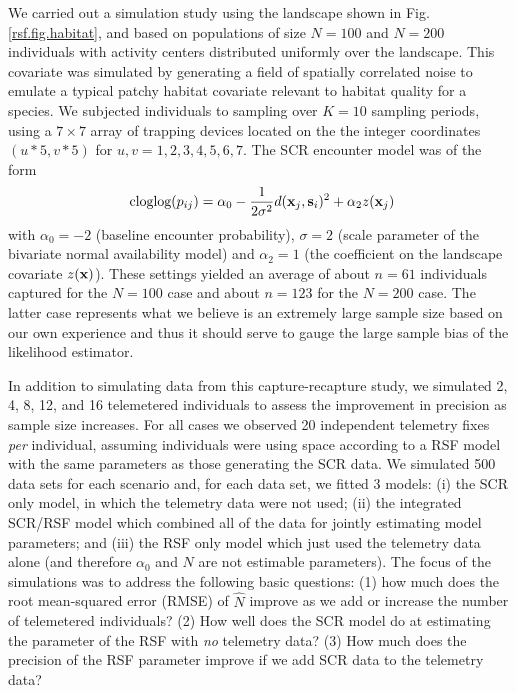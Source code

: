 \documentclass[12pt]{article}
\begin{document}
We carried out a simulation study using the landscape shown in
Fig. \ref{rsf.fig.habitat}, and based on populations of size $N=100$ and $N=200$
individuals with activity centers distributed uniformly over the
landscape.  This covariate was simulated by generating a field
of spatially correlated noise to emulate a typical patchy habitat
covariate relevant to habitat quality for a species.  We subjected individuals
to sampling over $K=10$ sampling periods, using a $7 \times 7$ array
of trapping devices located on the the integer coordinates $(u*5,v*5)$
for $u,v = 1,2,3,4,5,6,7$. The SCR encounter model was of the form
\[
\mbox{ cloglog}(p_{ij}) = \alpha_{0}  -\frac{1}{2\sigma^{2}}
d({\bf x}_{j},{\bf s}_{i})^{2} + \alpha_{2}  z({\bf x}_{j})
\]
with $\alpha_{0} = -2$ (baseline encounter probability), $\sigma =2$
(scale parameter of the bivariate normal availability model) and
$\alpha_{2} = 1$ (the coefficient on the landscape covariate $z({\bf
  x})$). 
These
settings yielded an average of about $n=61$ individuals captured for
the $N=100$ case and about $n=123$ for the $N=200$ case. The latter
case represents what we believe is an extremely large sample size
based on our own experience and thus it should serve to gauge the
large sample bias of the likelihood estimator.


In addition to simulating data from this capture-recapture study, we
simulated 2, 4, 8, 12, and 16 telemetered individuals to assess the
improvement in precision as sample size increases.  For all cases we
observed 20 independent telemetry fixes {\it per} individual, assuming
individuals were using space according to a RSF model with the same
parameters as those generating the SCR data. We simulated 500 data
sets for each scenario and, for each data set, we fitted 3 models: (i)
the SCR only model, in which the telemetry data were not used; (ii)
the integrated SCR/RSF model which combined all of the data for
jointly estimating model parameters; and (iii) the RSF only model
which just used the telemetry data alone (and therefore $\alpha_{0}$
and $N$ are not estimable parameters).  The focus of the simulations
was to address the following basic questions: (1) how much does the
root mean-squared error (RMSE) of $\hat{N}$ improve as we add or
increase the number of telemetered individuals?  (2) How well does the
SCR model do at estimating the parameter of the RSF with {\it no}
telemetry data?  (3) How much does the precision of the RSF parameter
improve if we add SCR data to the telemetry data?
\end{document}
